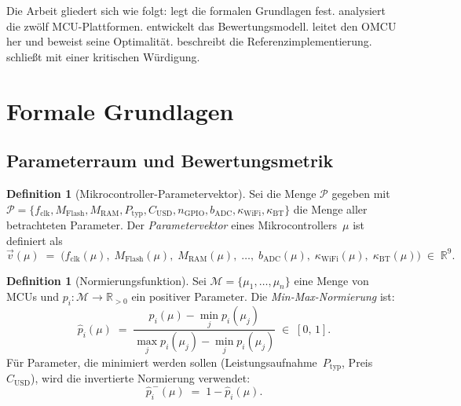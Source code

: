 ﻿\documentclass[12pt, a4paper]{article}
\theoremstyle{plain}
\theoremstyle{definition}
\newtheorem{definition}[theorem]{Definition}
\theoremstyle{remark}
\newcommand{\omcu}{\textsc{OMCU}}
\newcommand{\RR}{\mathbb{R}}
\begin{document}
Die Arbeit gliedert sich wie folgt:
 legt die formalen Grundlagen fest.
 analysiert die zwölf MCU-Plattformen.
 entwickelt das Bewertungsmodell.
 leitet den \omcu{} her und beweist seine Optimalität.
 beschreibt die Referenzimplementierung.
 schließt mit einer kritischen Würdigung.

\section{Formale Grundlagen}
\label{sec:grundlagen}

\subsection{Parameterraum und Bewertungsmetrik}

\begin{definition}[Mikrocontroller-Parametervektor]
\label{def:parametervektor}
  Sei die Menge $\mathcal{P}$ gegeben mit $\mathcal{P} = \{f_\text{clk}, M_\text{Flash}, M_\text{RAM},
  P_\text{typ}, C_\text{USD}, n_\text{GPIO}, b_\text{ADC},
  \kappa_\text{WiFi}, \kappa_\text{BT}\}$ die Menge aller betrachteten
  Parameter.
  Der \emph{Parametervektor} eines Mikrocontrollers~$\mu$ ist definiert als
  \[
    \vec{v}(\mu) \;=\;
    \bigl(
      f_\text{clk}(\mu),\;
      M_\text{Flash}(\mu),\;
      M_\text{RAM}(\mu),\;
      \ldots ,\;
      b_\text{ADC}(\mu),\;
      \kappa_\text{WiFi}(\mu),\;
      \kappa_\text{BT}(\mu)
    \bigr)
    \;\in\; \RR^9.
  \]
\end{definition}

\begin{definition}[Normierungsfunktion]
\label{def:normierung}
  Sei $\mathcal{M} = \{\mu_1, \ldots, \mu_n\}$ eine Menge von MCUs und
  $p_i \colon \mathcal{M} \to \RR_{>0}$ ein positiver Parameter.
  Die \emph{Min-Max-Normierung} ist:
  \[
    \hat{p}_i(\mu) \;=\;
    \frac{p_i(\mu) - \min_j p_i(\mu_j)}
         {\max_j p_i(\mu_j) - \min_j p_i(\mu_j)}
    \;\in\; [0,\,1].
  \]
  Für Parameter, die minimiert werden sollen
  (Leistungsaufnahme~$P_\text{typ}$, Preis~$C_\text{USD}$),
  wird die invertierte Normierung verwendet:
  \[
    \hat{p}_i^{\,-}(\mu) \;=\; 1 - \hat{p}_i(\mu).
  \]
\end{definition}
\end{document}
